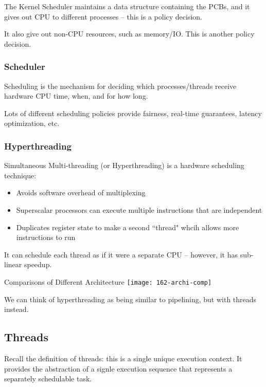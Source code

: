 \documentclass[openany]{book}
\begin{document}
The Kernel Scheduler maintains a data structure containing the PCBs, and it gives out CPU to different processes -- this is a policy decision.

It also give out non-CPU resources, such as memory/IO. This is another policy decision.

\subsubsection{Scheduler}
\begin{defn}[Scheduling]
	Scheduling is the mechanism for deciding which processes/threads receive hardware CPU time, when, and for how long.
\end{defn}

Lots of different scheduling policies provide fairness, real-time guarantees, latency optimization, etc.

\subsubsection{Hyperthreading}
Simultaneous Multi-threading (or Hyperthreading) is a hardware scheduling technique:
\begin{itemize}
	\item Avoids software overhead of multiplexing
	\item Superscalar processors can execute multiple instructions that are independent
	\item Duplicates register state to make a second ``thread" whcih allows more instructions to run
\end{itemize}

It can schedule each thread as if it were a separate CPU -- however, it has sub-linear speedup.

\begin{figurebox}[]{Comparisons of Different Architecture}
	\centering\texttt{[image: 162-archi-comp]}
\end{figurebox}

We can think of hyperthreading as being similar to pipelining, but with threads instead.

\subsection{Threads}
Recall the definition of threads: this is a single unique execution context. It provides the abstraction of a signle execution sequence that represents a separately schedulable task.
\end{document}
